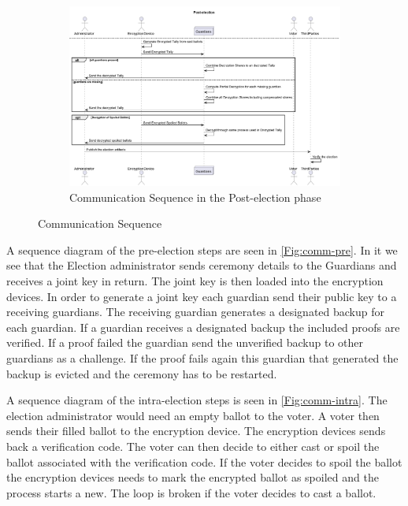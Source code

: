 \begin{figure}[ht]
    \hfill
    \begin{subfigure}[b]{\textwidth}
        \centering
        \includegraphics[width=\textwidth]{abbildungen/Diagramme/communication-seq_002.png}
        \caption{Communication Sequence in the Post-election phase}
        \label{Fig:comm-post}
    \end{subfigure}
    \caption{Communication Sequence}
    \label{fig:comm-seq}
\end{figure}

A sequence diagram of the pre-election steps are seen in \ref{Fig:comm-pre}. In it we see that the Election administrator sends ceremony details to the Guardians and receives a joint key in return. The joint key is then loaded into the encryption devices. In order to generate a joint key each guardian send their public key to a receiving guardians. The receiving guardian generates a designated backup for each guardian. If a guardian receives a designated backup the included proofs are verified. If a proof failed the guardian send the unverified backup to other guardians as a challenge. If the proof fails again this guardian that generated the backup is evicted and the ceremony has to be restarted. 

A sequence diagram of the intra-election steps is seen in \ref{Fig:comm-intra}. The election administrator would need an empty ballot to the voter. A voter then sends their filled ballot to the encryption device. The encryption devices sends back a verification code. The voter can then decide to either cast or spoil the ballot associated with the verification code. If the voter decides to spoil the ballot the encryption devices needs to mark the encrypted ballot as spoiled and the process starts a new. The loop is broken if the voter decides to cast a ballot.

